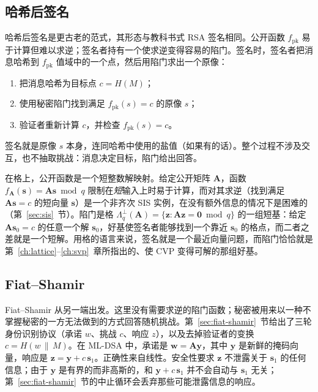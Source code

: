 \subsection{哈希后签名}

哈希后签名是更古老的范式，其形态与教科书式 RSA 签名相同。公开函数 $f_{\mathrm{pk}}$ 易于计算但难以求逆；签名者持有一个使求逆变得容易的陷门。签名时，签名者把消息哈希到 $f_{\mathrm{pk}}$ 值域中的一个点，然后用陷门求出一个原像：
\begin{enumerate}
  \item 把消息哈希为目标点 $c = H(M)$；
  \item 使用秘密陷门找到满足 $f_{\mathrm{pk}}(s) = c$ 的原像 $s$；
  \item 验证者重新计算 $c$，并检查 $f_{\mathrm{pk}}(s) = c$。
\end{enumerate}
签名就是原像 $s$ 本身，连同哈希中使用的盐值（如果有的话）。整个过程不涉及交互，也不抽取挑战：消息决定目标，陷门给出回答。

在格上，公开函数是一个短整数解映射。给定公开矩阵 $\mathbf{A}$，函数 $f_{\mathbf{A}}(\mathbf{s}) = \mathbf{A}\mathbf{s} \bmod q$ 限制在\emph{短}输入上时易于计算，而对其求逆（找到满足 $\mathbf{A}\mathbf{s} = c$ 的短向量 $\mathbf{s}$）是一个非齐次 SIS 实例，在没有额外信息的情况下是困难的（第~\ref{sec:sis}~节）。陷门是格 $\Lambda^{\perp}_q(\mathbf{A}) = \{\mathbf{z} : \mathbf{A}\mathbf{z} = \mathbf{0} \bmod q\}$ 的一组短基：给定 $\mathbf{A}\mathbf{s}_0 = c$ 的任意一个解 $\mathbf{s}_0$，好基使签名者能够找到一个靠近 $\mathbf{s}_0$ 的格点，而二者之差就是一个短解。用格的语言来说，签名就是一个最近向量问题，而陷门恰恰就是第~\ref{ch:lattice}--\ref{ch:svp}~章所指出的、使 CVP 变得可解的那组好基。

\subsection{Fiat--Shamir}

Fiat--Shamir 从另一端出发。这里没有需要求逆的陷门函数；秘密被用来以一种不掌握秘密的一方无法做到的方式回答随机挑战。第~\ref{sec:fiat-shamir}~节给出了三轮身份识别协议（承诺 $w$、挑战 $c$、响应 $z$），以及去掉验证者的变换 $c = H(w \,\|\, M)$。在 ML-DSA 中，承诺是 $\mathbf{w} = \mathbf{A}\mathbf{y}$，其中 $\mathbf{y}$ 是新鲜的掩码向量，响应是 $\mathbf{z} = \mathbf{y} + c\,\mathbf{s}_1$。正确性来自线性。安全性要求 $\mathbf{z}$ 不泄露关于 $\mathbf{s}_1$ 的任何信息；由于 $\mathbf{y}$ 是有界的而非高斯的，和 $\mathbf{y} + c\,\mathbf{s}_1$ 并不会自动与 $\mathbf{s}_1$ 无关；第~\ref{sec:fiat-shamir}~节的中止循环会丢弃那些可能泄露信息的响应。

